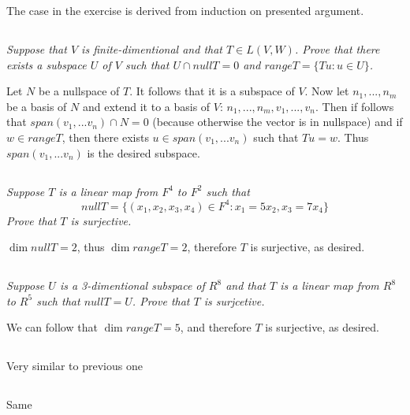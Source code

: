 \documentclass[11pt,oneside,titlepage]{book}
\begin{document}
The case in the exercise is derived from induction on presented argument.

\subsection{}

\textit{Suppose that $V$ is finite-dimentional and that $T \in L(V, W)$. Prove that there exists
  a subspace $U$ of $V$ such that $U \cap null T = 0$ and $range T = \{Tu: u \in U\}$.}

Let $N$ be a nullspace of $T$. It follows that it is a subspace of $V$. Now let
$n_1, ..., n_m$ be a basis of $N$ and extend it to a basis of $V$: $n_1, ..., n_m, v_1, ..., v_n$.
Then if follows that $span(v_1, ... v_n) \cap N = 0$ (because otherwise the vector is in nullspace)
and if $w \in rangeT$, then there exists $u \in span(v_1, ... v_n)$ such that
$Tu = w$. Thus $span(v_1, ... v_n)$ is the desired subspace.

\subsection{}

\textit{Suppose $T$ is a linear map from $F^4$ to $F^2$ such that}
$$null T = \{(x_1, x_2, x_3, x_4) \in F^4: x_1 = 5x_2, x_3 = 7x_4\}$$
\textit{Prove that $T$ is surjective.}

$\dim null T = 2$, thus $\dim range T = 2$, therefore $T$ is surjective, as desired.

\subsection{}
\textit{Suppose $U$ is a 3-dimentional subspace of $R^8$ and that $T$ is a linear map from
  $R^8$ to $R^5$ such that $null T = U$. Prove that $T$ is surjcetive.}

We can follow that $\dim range T = 5$, and therefore $T$ is surjective, as desired.

\subsection{}

Very similar to previous one

\subsection{}

Same
\end{document}
